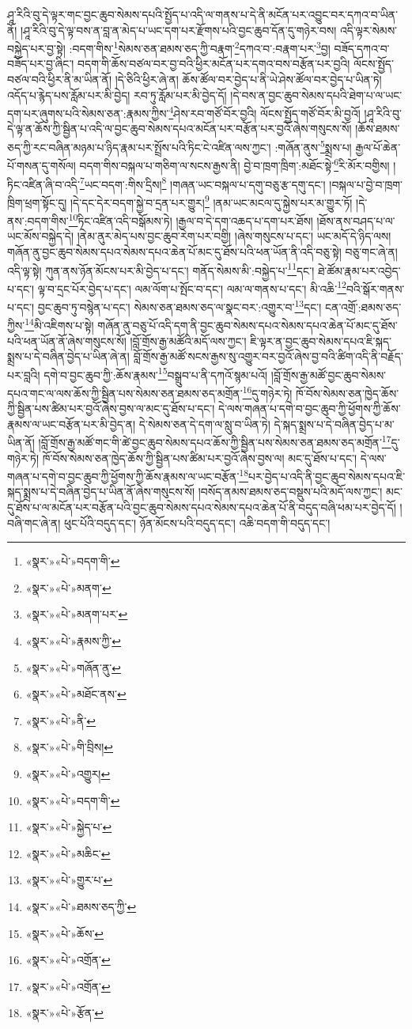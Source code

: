 ཤཱ་རིའི་བུ་དེ་ལྟར་གང་བྱང་ཆུབ་སེམས་དཔའི་སྤྱོད་པ་འདི་ལ་གནས་པ་དེ་ནི་མངོན་པར་འབྱུང་བར་དཀའ་བ་ཡིན་ནོ། །ཤཱ་རིའི་བུ་དེ་ལྟ་བས་ན་བླ་ན་མེད་པ་ཡང་དག་པར་རྫོགས་པའི་བྱང་ཆུབ་དོན་དུ་གཉེར་བས། འདི་ལྟར་སེམས་བསྐྱེད་པར་བྱ་སྟེ། :བདག་གིས་\footnote{«སྣར་»«པེ་»བདག་གི་}སེམས་ཅན་ཐམས་ཅད་ཀྱི་བརྣག་\footnote{«སྣར་»«པེ་»མནག་}དཀའ་བ་:བརྣག་པར་\footnote{«སྣར་»«པེ་»མནག་པར་}བྱ། བཟོད་དཀའ་བ་བཟོད་པར་བྱ་ཞིང་། བདག་གི་ཆོས་བཙལ་བར་བྱ་བའི་ཕྱིར་མངོན་པར་དགའ་བས་བརྩོན་པར་བྱའི། ལོངས་སྤྱོད་བཙལ་བའི་ཕྱིར་ནི་མ་ཡིན་ནོ། །དེ་ཅིའི་ཕྱིར་ཞེ་ན། ཆོས་ཚོལ་བར་བྱེད་པ་ནི་ཡེ་ཤེས་ཚོལ་བར་བྱེད་པ་ཡིན་ཏེ། འདོད་པ་རྙེད་པས་རློམ་པར་མི་བྱེད། རབ་ཏུ་རློམ་པར་མི་བྱེད་དོ། །དེ་བས་ན་བྱང་ཆུབ་སེམས་དཔའི་ཐེག་པ་ལ་ཡང་དག་པར་ཞུགས་པའི་སེམས་ཅན་:རྣམས་ཀྱིས་\footnote{«སྣར་»«པེ་»རྣམས་ཀྱི་}ཤེས་རབ་གཙོ་བོར་བྱའི། ལོངས་སྤྱོད་གཙོ་བོར་མི་བྱའོ། །ཤཱ་རིའི་བུ་དེ་ལྟ་ན་ཆོས་ཀྱི་སྦྱིན་པ་འདི་ལ་བྱང་ཆུབ་སེམས་དཔའ་མངོན་པར་བརྩོན་པར་བྱའོ་ཞེས་གསུངས་སོ། །ཆོས་ཐམས་ཅད་ཀྱི་རང་བཞིན་མཉམ་པ་ཉིད་རྣམ་པར་སྤྲོས་པའི་ཏིང་ངེ་འཛིན་ལས་ཀྱང་། :གཞོན་ནུས་\footnote{«སྣར་»«པེ་»གཞོན་ནུ་}སྨྲས་པ། རྒྱལ་པོ་ཆེན་པོ་གསན་དུ་གསོལ། བདག་གིས་བསྐལ་པ་གཅིག་ལ་སངས་རྒྱས་ནི། བྱེ་བ་ཁྲག་ཁྲིག་:མཐོང་སྟེ་\footnote{«སྣར་»«པེ་»མཐོང་ནས་}རི་མོར་བགྱིས། །ཏིང་འཛིན་ཞི་བ་འདི་\footnote{«སྣར་»«པེ་»ནི་}ཡང་བདག་:གིས་དྲིས།\footnote{«སྣར་»«པེ་»གི་བྲིས།} །གཞན་ཡང་བསྐལ་པ་དགུ་བཅུ་རྩ་དགུ་དང་། །བསྐལ་པ་བྱེ་བ་ཁྲག་ཁྲིག་ཕྲག་སྟོང་དུ། །དེ་དང་དེར་བདག་སྐྱེ་བ་དྲན་པར་གྱུར།\footnote{«སྣར་»«པེ་»འགྱུར།} །ནམ་ཡང་མངལ་དུ་སྐྱེས་པར་མ་གྱུར་ཏོ། །དེ་ནས་:བདག་གིས་\footnote{«སྣར་»«པེ་»བདག་གི་}ཏིང་འཛིན་འདི་བསྒོམས་ཏེ། །རྒྱལ་བ་དེ་དག་འཆད་པ་དག་པར་ཐོས། །ཐོས་ནས་བཤད་པ་ལ་ཡང་མོས་བསྐྱེད་དེ། །ནེམ་ནུར་མེད་པས་བྱང་ཆུབ་རེག་པར་བགྱི། །ཞེས་གསུངས་པ་དང་། ཡང་མདོ་དེ་ཉིད་ལས། གཞོན་ནུ་བྱང་ཆུབ་སེམས་དཔའ་སེམས་དཔའ་ཆེན་པོ་མང་དུ་ཐོས་པའི་ཕན་ཡོན་ནི་འདི་བཅུ་སྟེ། བཅུ་གང་ཞེ་ན། འདི་ལྟ་སྟེ། ཀུན་ནས་ཉོན་མོངས་པར་མི་བྱེད་པ་དང་། གནོད་སེམས་མི་:བསྐྱེད་པ་\footnote{«སྣར་»«པེ་»སྐྱེད་པ་}དང་། ཐེ་ཚོམ་རྣམ་པར་འབྱེད་པ་དང་། ལྟ་བ་དྲང་པོར་བྱེད་པ་དང་། ལམ་ལོག་པ་སྤོང་བ་དང་། ལམ་ལ་གནས་པ་དང་། མི་འཆི་\footnote{«སྣར་»«པེ་»མཆིང་}བའི་སྒོར་གནས་པ་དང་། བྱང་ཆུབ་ཏུ་བསྙེན་པ་དང་། སེམས་ཅན་ཐམས་ཅད་ལ་སྣང་བར་:འགྱུར་བ་\footnote{«སྣར་»«པེ་»གྱུར་པ་}དང་། ངན་འགྲོ་:ཐམས་ཅད་ཀྱིས་\footnote{«སྣར་»«པེ་»ཐམས་ཅད་ཀྱི་}མི་འཇིགས་པ་སྟེ། གཞོན་ནུ་བཅུ་པོ་འདི་དག་ནི་བྱང་ཆུབ་སེམས་དཔའ་སེམས་དཔའ་ཆེན་པོ་མང་དུ་ཐོས་པའི་ཕན་ཡོན་ནོ་ཞེས་གསུངས་སོ། །བློ་གྲོས་རྒྱ་མཚོའི་མདོ་ལས་ཀྱང་། ཇི་ལྟར་ན་བྱང་ཆུབ་སེམས་དཔའ་ཇི་སྐད་སྨྲས་པ་དེ་བཞིན་བྱེད་པ་ཡིན་ཞེ་ན། བློ་གྲོས་རྒྱ་མཚོ་སངས་རྒྱས་སུ་འགྱུར་བར་བྱའོ་ཞེས་བྱ་བའི་ཚིག་འདི་ནི་བརྗོད་པར་བླའི། དགེ་བ་བྱང་ཆུབ་ཀྱི་:ཆོས་རྣམས་\footnote{«སྣར་»«པེ་»ཆོས་}བསྒྲུབ་པ་ནི་དཀའོ་སྙམ་པའོ། །བློ་གྲོས་རྒྱ་མཚོ་བྱང་ཆུབ་སེམས་དཔའ་གང་ལ་ལས་ཆོས་ཀྱི་སྦྱིན་པས་སེམས་ཅན་ཐམས་ཅད་མགྲོན་\footnote{«སྣར་»«པེ་»འགྲོན་}དུ་གཉེར་ཏེ། ཁོ་བོས་སེམས་ཅན་ཁྱེད་ཆོས་ཀྱི་སྦྱིན་པས་ཚིམ་པར་བྱའོ་ཞེས་བྱས་ལ་མང་དུ་ཐོས་པ་དང་། དེ་ལས་གཞན་པ་དགེ་བ་བྱང་ཆུབ་ཀྱི་ཕྱོགས་ཀྱི་ཆོས་རྣམས་ལ་ཡང་བརྩོན་པར་མི་བྱེད་ན། དེ་སེམས་ཅན་དེ་དག་ལ་སླུ་བ་ཡིན་ཏེ། དེ་སྐད་སྨྲས་པ་དེ་བཞིན་བྱེད་པ་མ་ཡིན་ནོ། །བློ་གྲོས་རྒྱ་མཚོ་གང་གི་ཚེ་བྱང་ཆུབ་སེམས་དཔའ་ཆོས་ཀྱི་སྦྱིན་པས་སེམས་ཅན་ཐམས་ཅད་མགྲོན་\footnote{«སྣར་»«པེ་»འགྲོན་}དུ་གཉེར་ཏེ། ཁོ་བོས་སེམས་ཅན་ཁྱེད་ཆོས་ཀྱི་སྦྱིན་པས་ཚིམ་པར་བྱའོ་ཞེས་བྱས་ལ། མང་དུ་ཐོས་པ་དང་། དེ་ལས་གཞན་པ་དགེ་བ་བྱང་ཆུབ་ཀྱི་ཕྱོགས་ཀྱི་ཆོས་རྣམས་ལ་ཡང་བརྩོན་\footnote{«སྣར་»«པེ་»རྩོན་}པར་བྱེད་པ་འདི་ནི་བྱང་ཆུབ་སེམས་དཔའ་ཇི་སྐད་སྨྲས་པ་དེ་བཞིན་བྱེད་པ་ཡིན་ནོ་ཞེས་གསུངས་སོ། །བསོད་ནམས་ཐམས་ཅད་བསྡུས་པའི་མདོ་ལས་ཀྱང་། མང་དུ་ཐོས་པ་ལ་མངོན་པར་བརྩོན་པའི་བྱང་ཆུབ་སེམས་དཔའ་སེམས་དཔའ་ཆེན་པོ་ནི་བདུད་བཞི་ཕམ་པར་བྱེད་དོ། །བཞི་གང་ཞེ་ན། ཕུང་པོའི་བདུད་དང་། ཉོན་མོངས་པའི་བདུད་དང་། འཆི་བདག་གི་བདུད་དང་། 